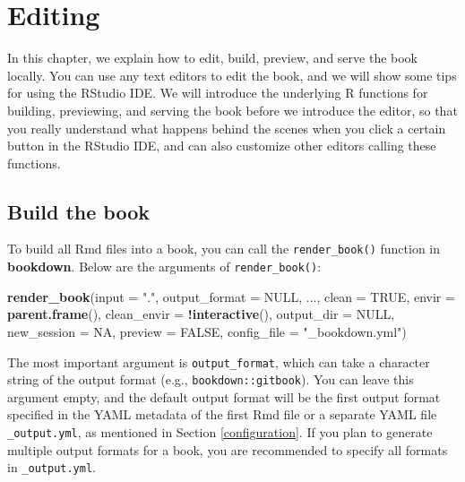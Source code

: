 \documentclass[
  12pt,
]{krantz}
\newenvironment{Shaded}{\begin{snugshade}}{\end{snugshade}}
\newcommand{\AttributeTok}[1]{\textcolor[rgb]{0.13,0.29,0.53}{#1}}
\newcommand{\ConstantTok}[1]{\textcolor[rgb]{0.56,0.35,0.01}{#1}}
\newcommand{\FunctionTok}[1]{\textcolor[rgb]{0.13,0.29,0.53}{\textbf{#1}}}
\newcommand{\NormalTok}[1]{#1}
\newcommand{\SpecialCharTok}[1]{\textcolor[rgb]{0.81,0.36,0.00}{\textbf{#1}}}
\newcommand{\StringTok}[1]{\textcolor[rgb]{0.31,0.60,0.02}{#1}}
\theoremstyle{definition}
\theoremstyle{definition}
\theoremstyle{definition}
\theoremstyle{definition}
\theoremstyle{remark}
\begin{document}
\chapter{Editing}\label{editing}

In this chapter, we explain how to edit, build, preview, and serve the book locally. You can use any text editors to edit the book, and we will show some tips for using the RStudio IDE. We will introduce the underlying R functions for building, previewing, and serving the book before we introduce the editor, so that you really understand what happens behind the scenes when you click a certain button in the RStudio IDE, and can also customize other editors calling these functions.

\section{Build the book}\label{build-the-book}

To build all Rmd files into a book, you can call the \texttt{render\_book()} function in \textbf{bookdown}. Below are the arguments of \texttt{render\_book()}:

\begin{Shaded}
\begin{Highlighting}[]
\FunctionTok{render\_book}\NormalTok{(}\AttributeTok{input =} \StringTok{"."}\NormalTok{, }\AttributeTok{output\_format =} \ConstantTok{NULL}\NormalTok{, ..., }\AttributeTok{clean =} \ConstantTok{TRUE}\NormalTok{,}
  \AttributeTok{envir =} \FunctionTok{parent.frame}\NormalTok{(), }\AttributeTok{clean\_envir =} \SpecialCharTok{!}\FunctionTok{interactive}\NormalTok{(),}
  \AttributeTok{output\_dir =} \ConstantTok{NULL}\NormalTok{, }\AttributeTok{new\_session =} \ConstantTok{NA}\NormalTok{, }\AttributeTok{preview =} \ConstantTok{FALSE}\NormalTok{,}
  \AttributeTok{config\_file =} \StringTok{"\_bookdown.yml"}\NormalTok{)}
\end{Highlighting}
\end{Shaded}

The most important argument is \texttt{output\_format}, which can take a character string of the output format (e.g., \texttt{\textquotesingle{}bookdown::gitbook\textquotesingle{}}). You can leave this argument empty, and the default output format will be the first output format specified in the YAML metadata of the first Rmd file or a separate YAML file \texttt{\_output.yml}, as mentioned in Section \ref{configuration}. If you plan to generate multiple output formats for a book, you are recommended to specify all formats in \texttt{\_output.yml}.
\end{document}
